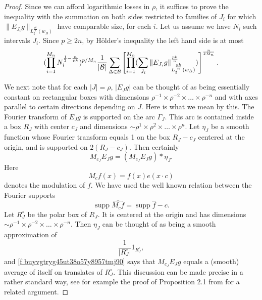 \documentclass[amssymb,amsfonts,12pt]{amsart}
\def\supp{{\operatorname{supp}}}\def\det{{\operatorname{det}}}\def\MLK{{\textbf{MLK}}}
\begin{document}
\begin{proof}
Since we can afford logarithmic losses in $\rho$, it suffices to prove the inequality with the summation on both sides restricted to  families of $J_i$ for which  $\|E_{J_i}g\|_{L_{\sharp}^{\frac{pk}{n}}(w_B)}$ have comparable size, for each $i$. Let us assume we have $N_i$ such intervals $J_i$. Since $p\ge 2n$, by H\"older's inequality the left hand side  is  at most
\begin{equation}
\label{ne4}
(\prod_{i=1}^{M_n}N_i^{\frac12-\frac{n}{pk}})^{p/{M_n}}\frac1{|{\mathcal B}|}\sum_{\Delta\in{\mathcal B}}\left[\prod_{i=1}^{M_n}(\sum_{J_i}\|E_{J_i}g\|_{L_{\sharp}^{\frac{pk}{n}}(w_\Delta)}^{\frac{pk}{n}})\right]^{\frac{n}{k M_n}}.
\end{equation}


We next note that for each $|J|=\rho$, $|E_Jg|$ can be thought of as being  essentially constant on rectangular boxes with dimensions $\rho^{-1}\times\rho^{-2}\times\ldots\times\rho^{-n}$ and with axes parallel to certain directions depending on $J$. Here is what we mean by this. The Fourier transform of $E_Jg$ is supported on the arc $\Gamma_J$. This arc is contained inside a box $R_J$ with center $c_J$ and dimensions $\sim\rho^{1}\times\rho^{2}\times\ldots\times \rho^{n}$. Let $\eta_J$ be a smooth function whose Fourier transform equals 1 on the box $R_J-c_J$ centered at the origin,  and is supported on $2(R_J-c_J)$. Then certainly
\begin{equation}
\label{f buyvgtryg45ut38o57y8957tmj90}
M_{c_J}E_Jg=(M_{c_J}E_Jg)*\eta_J.
\end{equation}
Here
$$M_cf(x)=f(x)e(x\cdot c)$$
denotes the modulation of $f$. We have used the well known relation between the Fourier supports
$$\supp \widehat{M_cf}=\supp \widehat{f}-c.$$
Let $R_J^{\circ}$ be the polar box of $R_J$. It is centered at the origin and has dimensions $\sim \rho^{-1}\times\rho^{-2}\times\ldots\times \rho^{-n}$. Then $\eta_J$ can be thought of as being a smooth approximation of $$\frac1{|R_J^{\circ}|}1_{R_J^{\circ}},$$
and \eqref{f buyvgtryg45ut38o57y8957tmj90} says that $M_{c_J}E_Jg$ equals a (smooth) average of itself on translates of $R_J^{\circ}$. This discussion can be made precise in a rather standard way, see for example the proof of Proposition 2.1 from \cite{BCT} for a related argument.


\end{proof}
\end{document}
